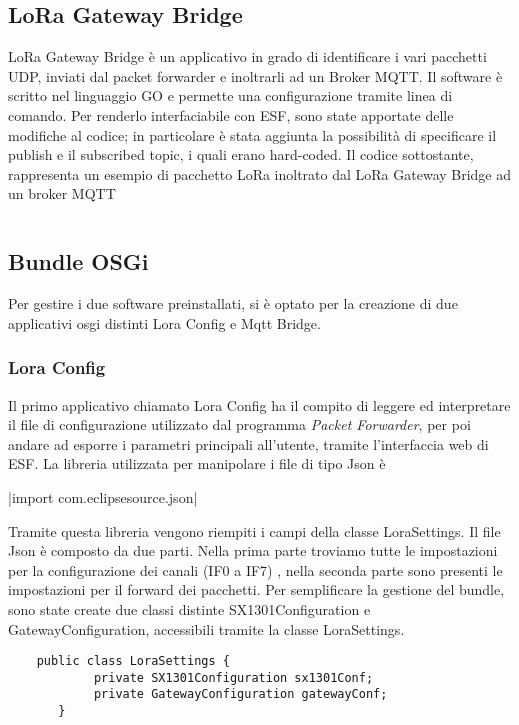 \subsection{LoRa Gateway Bridge}
LoRa Gateway Bridge è un applicativo in grado di identificare i vari pacchetti
UDP, inviati dal packet forwarder e  inoltrarli ad un Broker MQTT. 
Il software è scritto nel linguaggio GO e permette una configurazione tramite
linea di comando.  Per renderlo interfaciabile con ESF, sono state apportate delle 
modifiche al codice; in particolare è stata aggiunta la possibilità di
specificare il publish e il subscribed topic, i quali erano hard-coded.
Il codice sottostante, rappresenta un esempio di pacchetto LoRa inoltrato dal
LoRa Gateway Bridge ad un broker MQTT
\inputminted[mathescape, gobble=2, frame=lines, linenos=true
framesep=2mm, firstline=1,lastline=23]{json}{Code_Files/message.json}

\subsection{Bundle OSGi}
Per gestire i due software preinstallati, si è optato per la creazione di due
applicativi osgi distinti Lora Config e Mqtt Bridge.

\subsubsection{Lora Config}
Il primo applicativo chiamato Lora Config ha il compito di leggere ed
interpretare il file di configurazione utilizzato dal programma \emph{Packet
Forwarder}, per poi andare ad esporre i parametri principali all'utente, tramite
l'interfaccia web di ESF.
La libreria utilizzata per manipolare i file di tipo Json è 

|import com.eclipsesource.json|

Tramite questa libreria vengono riempiti i campi della classe LoraSettings. Il file
Json è composto da due parti. Nella prima parte
troviamo tutte le impostazioni per la configurazione dei canali (IF0 a IF7)
, nella seconda
parte sono presenti le impostazioni per il forward dei pacchetti. 
Per semplificare la gestione del bundle, sono state create due classi distinte
SX1301Configuration e GatewayConfiguration, accessibili tramite la classe LoraSettings.

\begin{verbatim}
    public class LoraSettings {
            private SX1301Configuration sx1301Conf;
            private GatewayConfiguration gatewayConf;
       } 
\end{verbatim}

